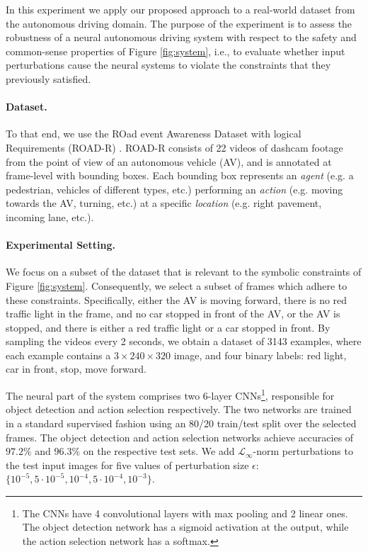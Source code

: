 In this experiment we apply our proposed approach to a real-world dataset from the autonomous driving domain. The purpose of the experiment is to assess the robustness of a neural autonomous driving system with respect to the safety and common-sense properties of Figure \ref{fig:system}, i.e., to evaluate whether input perturbations cause the neural systems to violate the constraints that they previously satisfied.

\paragraph{Dataset.} To that end, we use the ROad event Awareness Dataset with logical Requirements (ROAD-R) \cite{giunchiglia2023road}. ROAD-R consists of 22 videos of dashcam footage from the point of view of an autonomous vehicle (AV), and is annotated at frame-level with bounding boxes. Each bounding box represents an \textit{agent} (e.g. a pedestrian, vehicles of different types, etc.) performing an \textit{action} (e.g. moving towards the AV, turning, etc.) at a specific \textit{location} (e.g. right pavement, incoming lane, etc.). 


\paragraph{Experimental Setting.} 
We focus on a subset of the dataset that is relevant to the symbolic constraints of Figure \ref{fig:system}. Consequently, we select a subset of frames which adhere to these constraints. Specifically, either the AV is moving forward, there is no red traffic light in the frame, and no car stopped in front of the AV, or the AV is stopped, and there is either a red traffic light or a car stopped in front. By sampling the videos every 2 seconds, we obtain a dataset of 3143 examples, where each example contains a $3 \times 240 \times 320$ image, and four binary labels: red light, car in front, stop, move forward.


The neural part of the system comprises two 6-layer CNNs\footnote{The CNNs have 4 convolutional layers with max pooling and 2 linear ones. The object detection network has a sigmoid activation at the output, while the action selection network has a softmax.}, responsible for object detection and action selection respectively. The two networks are trained in a standard supervised fashion using an 80/20 train/test split over the selected frames. The object detection and action selection networks achieve accuracies of $97.2\%$ and $96.3\%$ on the respective test sets. We add $\mathcal{L}_{\infty}$-norm perturbations to the test input images  for five values of perturbation size $\epsilon$: $\{10^{-5}, 5 \cdot 10^{-5}, 10^{-4}, 5 \cdot 10^{-4}, 10^{-3}\}$. 


